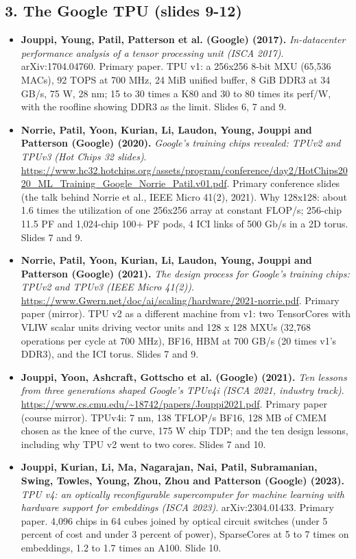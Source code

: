 \documentclass[11pt,letterpaper]{article}
\begin{document}
\subsection*{3. The Google TPU (slides 9-12)}
\begin{itemize}[leftmargin=1.2em,itemsep=3pt]\sloppy
\item \textbf{Jouppi, Young, Patil, Patterson et al. (Google) (2017).} \textit{In-datacenter performance analysis of a tensor processing unit (ISCA 2017)}. arXiv:1704.04760. Primary paper. TPU v1: a 256x256 8-bit MXU (65,536 MACs), 92 TOPS at 700 MHz, 24 MiB unified buffer, 8 GiB DDR3 at 34 GB/s, 75 W, 28 nm; 15 to 30 times a K80 and 30 to 80 times its perf/W, with the roofline showing DDR3 as the limit. Slides 6, 7 and 9.
\item \textbf{Norrie, Patil, Yoon, Kurian, Li, Laudon, Young, Jouppi and Patterson (Google) (2020).} \textit{Google's training chips revealed: TPUv2 and TPUv3 (Hot Chips 32 slides)}. \url{https://www.hc32.hotchips.org/assets/program/conference/day2/HotChips2020_ML_Training_Google_Norrie_Patil.v01.pdf}. Primary conference slides (the talk behind Norrie et al., IEEE Micro 41(2), 2021). Why 128x128: about 1.6 times the utilization of one 256x256 array at constant FLOP/s; 256-chip 11.5 PF and 1,024-chip 100+ PF pods, 4 ICI links of 500 Gb/s in a 2D torus. Slides 7 and 9.
\item \textbf{Norrie, Patil, Yoon, Kurian, Li, Laudon, Young, Jouppi and Patterson (Google) (2021).} \textit{The design process for Google's training chips: TPUv2 and TPUv3 (IEEE Micro 41(2))}. \url{https://www.Gwern.net/doc/ai/scaling/hardware/2021-norrie.pdf}. Primary paper (mirror). TPU v2 as a different machine from v1: two TensorCores with VLIW scalar units driving vector units and 128 x 128 MXUs (32,768 operations per cycle at 700 MHz), BF16, HBM at 700 GB/s (20 times v1's DDR3), and the ICI torus. Slides 7 and 9.
\item \textbf{Jouppi, Yoon, Ashcraft, Gottscho et al. (Google) (2021).} \textit{Ten lessons from three generations shaped Google's TPUv4i (ISCA 2021, industry track)}. \url{https://www.cs.cmu.edu/~18742/papers/Jouppi2021.pdf}. Primary paper (course mirror). TPUv4i: 7 nm, 138 TFLOP/s BF16, 128 MB of CMEM chosen as the knee of the curve, 175 W chip TDP; and the ten design lessons, including why TPU v2 went to two cores. Slides 7 and 10.
\item \textbf{Jouppi, Kurian, Li, Ma, Nagarajan, Nai, Patil, Subramanian, Swing, Towles, Young, Zhou, Zhou and Patterson (Google) (2023).} \textit{TPU v4: an optically reconfigurable supercomputer for machine learning with hardware support for embeddings (ISCA 2023)}. arXiv:2304.01433. Primary paper. 4,096 chips in 64 cubes joined by optical circuit switches (under 5 percent of cost and under 3 percent of power), SparseCores at 5 to 7 times on embeddings, 1.2 to 1.7 times an A100. Slide 10.

\end{itemize}
\end{document}
